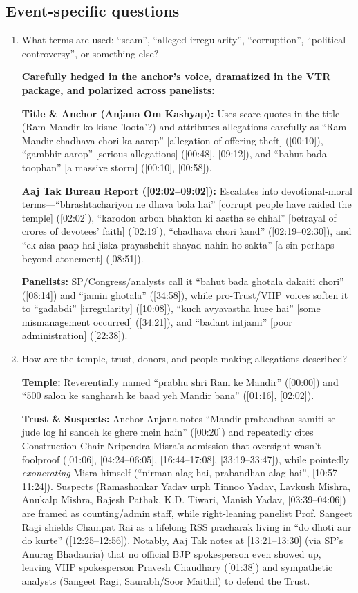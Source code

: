 \documentclass[10pt,a4paper]{article}
\begin{document}
\subsection*{Event-specific questions}
\begin{enumerate}[leftmargin=1.5em, itemsep=6pt, topsep=4pt]
  \item What terms are used: ``scam'', ``alleged irregularity'', ``corruption'', ``political controversy'', or something else?\par\smallskip
  \textbf{Carefully hedged in the anchor's voice, dramatized in the VTR package, and polarized across panelists:}

  \textbf{Title \& Anchor (Anjana Om Kashyap):} Uses scare-quotes in the title (Ram Mandir ko kisne 'loota'?) and attributes allegations carefully as ``Ram Mandir chadhava chori ka aarop'' [allegation of offering theft] ([00:10]), ``gambhir aarop'' [serious allegations] ([00:48], [09:12]), and ``bahut bada toophan'' [a massive storm] ([00:10], [00:58]).

  \textbf{Aaj Tak Bureau Report ([02:02--09:02]):} Escalates into devotional-moral terms---``bhrashtachariyon ne dhava bola hai'' [corrupt people have raided the temple] ([02:02]), ``karodon arbon bhakton ki aastha se chhal'' [betrayal of crores of devotees' faith] ([02:19]), ``chadhava chori kand'' ([02:19--02:30]), and ``ek aisa paap hai jiska prayashchit shayad nahin ho sakta'' [a sin perhaps beyond atonement] ([08:51]).

  \textbf{Panelists:} SP/Congress/analysts call it ``bahut bada ghotala dakaiti chori'' ([08:14]) and ``jamin ghotala'' ([34:58]), while pro-Trust/VHP voices soften it to ``gadabdi'' [irregularity] ([10:08]), ``kuch avyavastha huee hai'' [some mismanagement occurred] ([34:21]), and ``badant intjami'' [poor administration] ([22:38]).
  \item How are the temple, trust, donors, and people making allegations described?\par\smallskip
  \textbf{Temple:} Reverentially named ``prabhu shri Ram ke Mandir'' ([00:00]) and ``500 salon ke sangharsh ke baad yeh Mandir bana'' ([01:16], [02:02]).

  \textbf{Trust \& Suspects:} Anchor Anjana notes ``Mandir prabandhan samiti se jude log hi sandeh ke ghere mein hain'' ([00:20]) and repeatedly cites Construction Chair Nripendra Misra's admission that oversight wasn't foolproof ([01:06], [04:24--06:05], [16:44--17:08], [33:19--33:47]), while pointedly \emph{exonerating} Misra himself (``nirman alag hai, prabandhan alag hai'', [10:57--11:24]). Suspects (Ramashankar Yadav urph Tinnoo Yadav, Lavkush Mishra, Anukalp Mishra, Rajesh Pathak, K.D. Tiwari, Manish Yadav, [03:39--04:06]) are framed as counting/admin staff, while right-leaning panelist Prof. Sangeet Ragi shields Champat Rai as a lifelong RSS pracharak living in ``do dhoti aur do kurte'' ([12:25--12:56]). Notably, Aaj Tak notes at [13:21--13:30] (via SP's Anurag Bhadauria) that no official BJP spokesperson even showed up, leaving VHP spokesperson Pravesh Chaudhary ([01:38]) and sympathetic analysts (Sangeet Ragi, Saurabh/Soor Maithil) to defend the Trust.


\end{enumerate}
\end{document}
